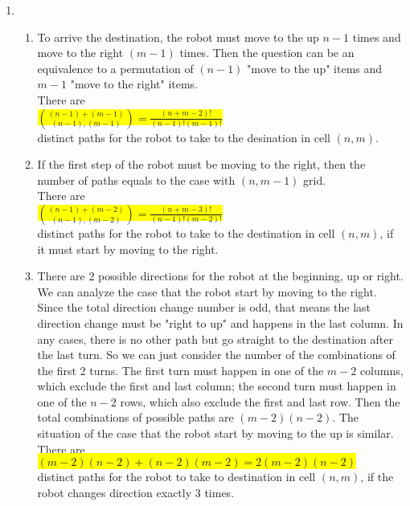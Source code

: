 \documentclass{article}
\begin{document}
\begin{enumerate}
\begin{enumerate}
	\end{enumerate}
	\item
	\begin{enumerate}
		\item
		\mysolu
		To arrive the destination, the robot must move to the up ${n-1}$ times and move to the right $(m-1)$ times. Then the question can be an equivalence to a permutation of $(n-1)$ "move to the up" items and ${m-1}$ "move to the right" items.\\
		\myansw
		There are\\
		\colorbox{yellow}{
			${{(n-1)+(m-1) \choose (n-1),(m-1)} = \frac{(n+m-2)!}{(n-1)!(m-1)!}}$
		}\\
		distinct paths for the robot to take to the desination in cell ${(n,m)}$.\\
		
		\item
		\mysolu
		If the first step of the robot must be moving to the right, then the number of paths equals to the case with ${(n,m-1)}$ grid.\\
		\myansw
		There are\\
		\colorbox{yellow}{
			${{(n-1)+(m-2) \choose (n-1),(m-2)} = \frac{(n+m-3)!}{(n-1)!(m-2)!}}$
		}\\
		distinct paths for the robot to take to the destination in cell ${(n,m)}$, if it must start by moving to the right.\\
		
		\item
		\mysolu
		There are 2 possible directions for the robot at the beginning, up or right. We can analyze the case that the robot start by moving to the right. Since the total direction change number is odd, that means the last direction change must be "right to up" and happens in the last column. In any cases, there is no other path but go straight to the destination after the last turn. So we can just consider the number of the combinations of the first 2 turns. The first turn must happen in one of the ${m-2}$ columns, which exclude the first and last column; the second turn must happen in one of the ${n-2}$ rows, which also exclude the first and last row. Then the total combinations of possible paths are ${(m-2)(n-2)}$. The situation of the case that the robot start by moving to the up is similar.\\
		\myansw
		There are\\
		\colorbox{yellow}{
			${(m-2)(n-2)+(n-2)(m-2)=2(m-2)(n-2)}$
		}\\
		distinct paths for the robot to take to destination in cell ${(n,m)}$, if the robot changes direction exactly 3 times.\\
		

\end{enumerate}
\end{enumerate}
\end{document}
